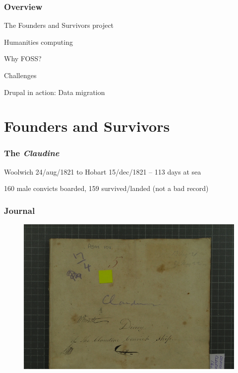 \documentclass[ignorenonframetext,11pt]{beamer}
\date{2 March 2010}
\institute{\affiliation}
\date[\mydate]{\mydate~ / \event }
\title[\mytitle\hspace{2em}\insertframenumber/
\inserttotalframenumber]{\mytitle}
\author{\myauthor}
\begin{document}
\frame{\setlength\parskip{0pt}\titlepage}


\begin{frame}
\frametitle{Overview}
\label{overview}

The Founders and Survivors project


Humanities computing


Why FOSS?


Challenges


Drupal in action: Data migration



\end{frame}
		

\section{Founders and Survivors}
\label{foundersandsurvivors}

\begin{frame}
\frametitle{The {\itshape Claudine}}
\label{theclaudine}

Woolwich 24/aug/1821 to Hobart 15/dec/1821 -- 113 days at sea


160 male convicts boarded, 159 survived/landed (not a bad record)



\end{frame}
		

\begin{frame}
\frametitle{Journal}
\label{journal}

\begin{figure}
	\label{journal}
	\begin{center}
	\includegraphics[keepaspectratio,width=\textwidth, height=.75\textheight]{images/claudine33.png}
	\end{center}
	\end{figure}
	



\end{frame}
		
\end{document}
